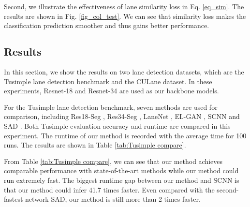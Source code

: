 \documentclass[runningheads]{llncs}
\begin{document}
Second, we illustrate the effectiveness of lane similarity loss in Eq. \ref{eq_sim}. The results are shown in Fig. \ref{fig_col_test}. We can see that similarity loss makes the classification prediction smoother and thus gains better performance.






\subsection{Results}
In this section, we show the results on two lane detection datasets, which are the Tusimple lane detection benchmark and the CULane dataset. In these experiments, Resnet-18 and Resnet-34 \cite{resnet} are used as our backbone models.

For the Tusimple lane detection benchmark, seven methods are used for comparison, including Res18-Seg \cite{chen2017deeplab}, Res34-Seg \cite{chen2017deeplab}, LaneNet \cite{End-to-End}, EL-GAN \cite{ghafoorian2018gan}, SCNN \cite{SCNN} and SAD \cite{SAD}. Both Tusimple evaluation accuracy and runtime are compared in this experiment. The runtime of our method is recorded with the average time for 100 runs. The results are shown in Table \ref{tab:Tusimple compare}.


From Table \ref{tab:Tusimple compare}, we can see that our method achieves comparable performance with state-of-the-art methods while our method could run extremely fast. The biggest runtime gap between our method and SCNN is that our method could infer 41.7 times faster. Even compared with the second-fastest network SAD, our method is still more than 2 times faster. 
\end{document}
